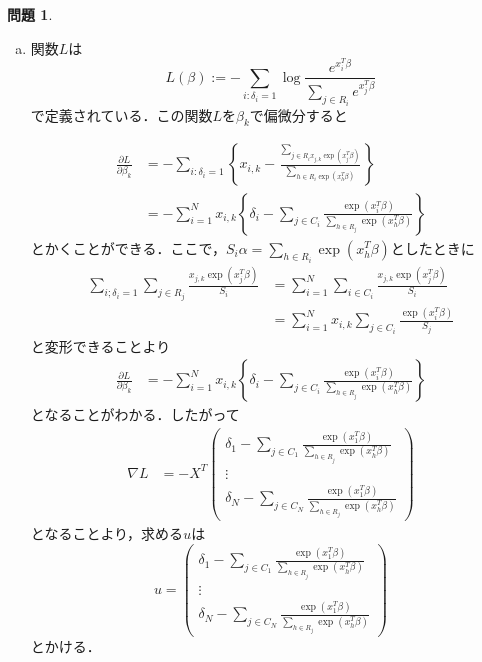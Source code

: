 \documentclass[titlepage]{jsarticle}
\theoremstyle{definition}
\newtheorem{Ex}{問題}
\theoremstyle{mystyle} %
\begin{document}
\begin{Ex}
  \begin{enumerate}[(a)]

\item 関数$L$は
$$L(\beta) := -\sum_{i:\delta_i = 1}\log \frac{e^{x_i^T \beta}}{\sum_{j\in R_i}e^{x_j^T \beta}}$$
で定義されている．この関数$L$を$\beta_k$で偏微分すると

\begin{align*}
  \frac{\partial L}{\partial \beta_k}&=-\sum_{i:\delta_i = 1}\left\{x_{i,k}-\frac{\sum_{j\in R_i x_{j,k}\exp(x_j^T \beta)}}{\sum_{h\in R_i\exp(x_h^T \beta) }}\right\}\\
  &=-\sum_{i=1}^N x_{i,k}\left\{
    \delta_i - \sum_{j\in C_i}\frac{\exp(x_i^T \beta)}{\sum_{h\in R_j}\exp(x_h^T \beta)}
  \right\}
\end{align*}
とかくことができる．ここで，$S_i\alpha= \sum_{h\in R_i}\exp(x_h^T \beta)$としたときに
\begin{align*}
\sum_{i;\delta_i=1}\sum_{j\in R_j}\frac{x_{j,k}\exp(x_j^T \beta)}{S_i}&= \sum_{i=1}^N\sum_{i\in C_i}\frac{x_{j,k}\exp(x_j^T \beta)}{S_i}\\
&=\sum_{i=1}^N x_{i,k}\sum_{j\in C_i}\frac{\exp(x_i^T \beta)}{S_j}
\end{align*}
と変形できることより
\begin{align*}
  \frac{\partial L}{\partial \beta_k}&=
  -\sum_{i=1}^N x_{i,k}\left\{\delta_i - \sum_{j\in C_i}\frac{\exp(x_i^T \beta)}{\sum_{h\in R_j}\exp(x_h^T \beta)}\right\}
\end{align*}
となることがわかる．したがって
\begin{align*}
  \nabla L&=-X^T \left(\begin{array}{c}
    \delta_1- \sum_{j\in C_1}\frac{\exp(x_1^T \beta)}{\sum_{h\in R_j}\exp(x_h^T \beta)}\\
    \vdots \\
    \delta_N- \sum_{j\in C_N}\frac{\exp(x_1^T \beta)}{\sum_{h\in R_j}\exp(x_h^T \beta)}
  \end{array}\right)
\end{align*}
となることより，求める$u$は
$$u=\left(\begin{array}{c}
  \delta_1- \sum_{j\in C_1}\frac{\exp(x_1^T \beta)}{\sum_{h\in R_j}\exp(x_h^T \beta)}\\
  \vdots \\
  \delta_N- \sum_{j\in C_N}\frac{\exp(x_1^T \beta)}{\sum_{h\in R_j}\exp(x_h^T \beta)}
\end{array}\right)$$
とかける．\\


\end{enumerate}
\end{Ex}
\end{document}
